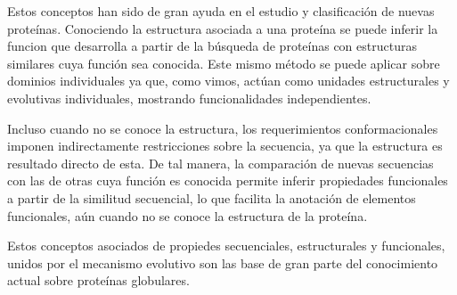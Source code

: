 Estos conceptos han sido de gran ayuda en el estudio y clasificación de nuevas proteínas. 
Conociendo la estructura asociada a una proteína se puede inferir la funcion que desarrolla a partir de la búsqueda de proteínas con estructuras similares cuya función sea conocida.
Este mismo método se puede aplicar sobre dominios individuales ya que, como vimos, actúan como unidades estructurales y evolutivas individuales, mostrando funcionalidades independientes.

Incluso cuando no se conoce la estructura, los requerimientos conformacionales imponen indirectamente restricciones sobre la secuencia, ya que la estructura es resultado directo de esta.
De tal manera, la comparación de nuevas secuencias con las de otras cuya función es conocida permite inferir propiedades funcionales a partir de la similitud secuencial, 
lo que facilita la anotación de elementos funcionales, aún cuando no se conoce la estructura de la proteína.

Estos conceptos asociados de propiedes secuenciales, estructurales y funcionales, unidos por el mecanismo evolutivo son las base de gran parte del conocimiento actual sobre proteínas globulares.

% 






